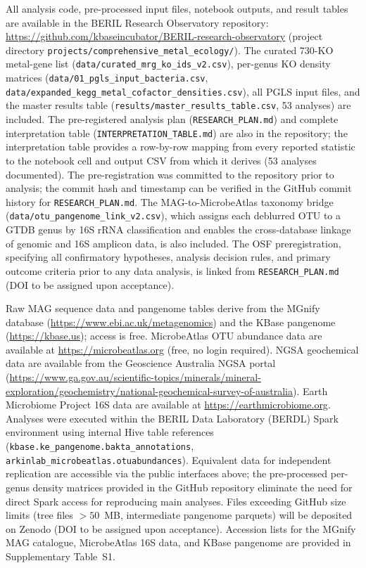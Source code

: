 \documentclass[times]{zHenriquesLab-StyleBioRxiv}
\begin{document}
All analysis code, pre-processed input files, notebook outputs, and result
tables are available in the BERIL Research Observatory repository:
\url{https://github.com/kbaseincubator/BERIL-research-observatory}
(project directory \texttt{projects/comprehensive\_metal\_ecology/}).
The curated 730-KO metal-gene list (\texttt{data/curated\_mrg\_ko\_ids\_v2.csv}),
per-genus KO density matrices (\texttt{data/01\_pgls\_input\_bacteria.csv},
\texttt{data/expanded\_kegg\_metal\_cofactor\_densities.csv}), all PGLS input
files, and the master results table (\texttt{results/master\_results\_table.csv},
53 analyses) are included. The pre-registered analysis plan
(\texttt{RESEARCH\_PLAN.md}) and complete interpretation table
(\texttt{INTERPRETATION\_TABLE.md}) are also in the repository; the
interpretation table provides a row-by-row mapping from every reported
statistic to the notebook cell and output CSV from which it derives (53
analyses documented). The pre-registration was committed to the repository
prior to analysis; the commit hash and timestamp can be verified in the
GitHub commit history for \texttt{RESEARCH\_PLAN.md}. The
MAG-to-MicrobeAtlas taxonomy bridge (\texttt{data/otu\_pangenome\_link\_v2.csv}),
which assigns each deblurred OTU to a GTDB genus by 16S rRNA classification and
enables the cross-database linkage of genomic and 16S amplicon data, is also
included. The OSF preregistration, specifying all confirmatory hypotheses,
analysis decision rules, and primary outcome criteria prior to any data analysis,
is linked from \texttt{RESEARCH\_PLAN.md} (DOI to be assigned upon acceptance).

Raw MAG sequence data and pangenome tables derive from the MGnify database
(\url{https://www.ebi.ac.uk/metagenomics}) and the KBase pangenome
(\url{https://kbase.us}); access is free. MicrobeAtlas OTU abundance data
are available at \url{https://microbeatlas.org} (free, no login required). NGSA
geochemical data are available from the Geoscience Australia NGSA portal
(\url{https://www.ga.gov.au/scientific-topics/minerals/mineral-exploration/geochemistry/national-geochemical-survey-of-australia}).
Earth Microbiome Project 16S data are available at \url{https://earthmicrobiome.org}.
Analyses were executed within the BERIL Data Laboratory (BERDL) Spark environment
using internal Hive table references (\texttt{kbase.ke\_pangenome.bakta\_annotations},
\texttt{arkinlab\_microbeatlas.otuabundances}). Equivalent data for independent
replication are accessible via the public interfaces above; the pre-processed
per-genus density matrices provided in the GitHub repository eliminate the need
for direct Spark access for reproducing main analyses. Files exceeding GitHub size
limits (tree files $> 50$~MB, intermediate pangenome parquets) will be deposited
on Zenodo (DOI to be assigned upon acceptance). Accession lists for the
MGnify MAG catalogue, MicrobeAtlas 16S data, and KBase pangenome are provided
in Supplementary Table~S1.
\end{document}
